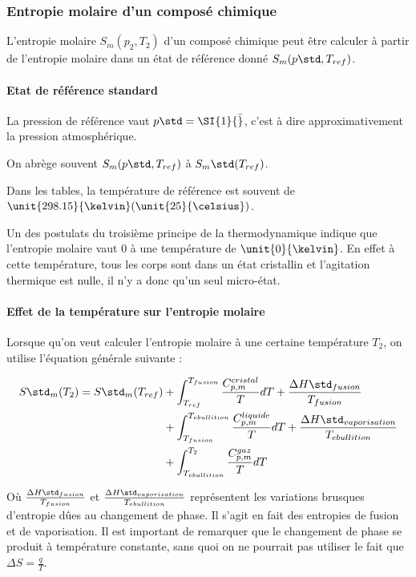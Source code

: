 \subsubsection{Entropie molaire d'un composé chimique}
L'entropie molaire $S_m(p_2, T_2)$ d'un composé chimique
peut être calculer à partir de l'entropie molaire dans un
état de référence donné $S_m (p\std, T_{ref})$.

\paragraph{Etat de référence standard}
La pression de référence vaut $p\std = \SI{1}{\bar}$, c'est
à dire approximativement la pression atmosphérique.

On abrège souvent 
$S_m (p\std, T_{ref})$ à $S_m\std (T_{ref})$.

Dans les tables, la température de référence est souvent
de $\unit{298.15}{\kelvin} (\unit{25}{\celsius})$.

Un des postulats du troisième principe de la thermodynamique
indique que l'entropie molaire vaut 0 à une température de 
$\unit{0}{\kelvin}$. En effet à cette température, tous
les corps sont dans un état cristallin et l'agitation thermique
est nulle, il n'y a donc qu'un seul micro-état.

\paragraph{Effet de la température sur l'entropie molaire}
Lorsque qu'on veut calculer l'entropie molaire à une certaine
température $T_2$, on utilise l'équation générale suivante :

\begin{align*}
		S\std_m(T_2) = S\std_m(T_{ref})	&+ \int_{T_{ref}}^{T_{fusion}} 
																	\frac{C^{cristal}_{p, m}}{T}dT 
																	+ \frac{\Delta H\std_{fusion}}{T_{fusion}}\\
															&+  \int_{T_{fusion}}^{T_{ebullition}} 
																	\frac{C^{liquide}_{p, m}}{T}dT 
																	+ \frac{\Delta H\std_{vaporisation}}{T_{ebullition}}\\
															&+  \int_{T_{ebullition}}^{T_2} 
																	\frac{C^{gaz}_{p, m}}{T}dT 
\end{align*}

Où $\frac{\Delta H\std_{fusion}}{T_{fusion}}$ et 
$\frac{\Delta H\std_{vaporisation}}{T_{ebullition}}$ représentent
les variations brusques d'entropie dûes au changement de phase.
Il s'agit en fait des entropies de fusion et de vaporisation.
Il est important de remarquer que le changement de phase se produit
à température constante, sans quoi on ne pourrait pas utiliser le fait
que $\Delta S = \frac{q}{T}$.


